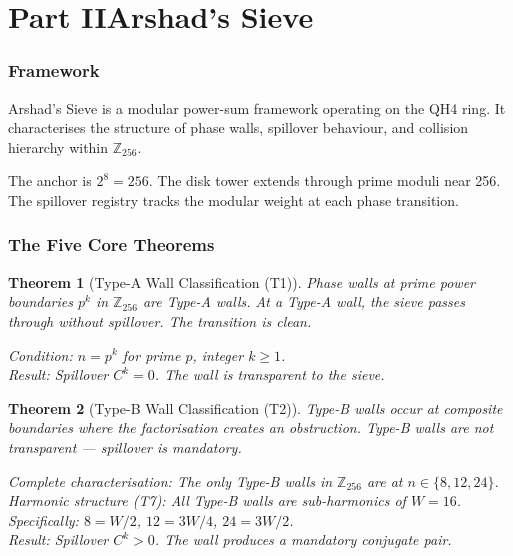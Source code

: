 \documentclass[12pt,a4paper]{article}
\newtheorem{theorem}{Theorem}[section]
\theoremstyle{definition}
\begin{document}
\part*{Part II\quad Arshad's Sieve}

\section{Framework}

Arshad's Sieve is a modular power-sum framework operating on the QH4 ring. It characterises the structure of phase walls, spillover behaviour, and collision hierarchy within $\mathbb{Z}_{256}$.

The anchor is $2^{8} = 256$. The disk tower extends through prime moduli near 256. The spillover registry tracks the modular weight at each phase transition.

\section{The Five Core Theorems}

\begin{theorem}[Type-A Wall Classification (T1)]
Phase walls at prime power boundaries $p^{k}$ in $\mathbb{Z}_{256}$ are \emph{Type-A walls}. At a Type-A wall, the sieve passes through without spillover. The transition is clean.

\textit{Condition:} $n = p^{k}$ for prime $p$, integer $k \geq 1$.\\
\textit{Result:} Spillover $C^{k} = 0$. The wall is transparent to the sieve.
\end{theorem}

\begin{theorem}[Type-B Wall Classification (T2)]
Type-B walls occur at composite boundaries where the factorisation creates an obstruction. Type-B walls are not transparent --- spillover is mandatory.

\textit{Complete characterisation:} The only Type-B walls in $\mathbb{Z}_{256}$ are at $n \in \{8, 12, 24\}$.\\
\textit{Harmonic structure (T7):} All Type-B walls are sub-harmonics of $W = 16$. Specifically: $8 = W/2$, $12 = 3W/4$, $24 = 3W/2$.\\
\textit{Result:} Spillover $C^{k} > 0$. The wall produces a mandatory conjugate pair.
\end{theorem}
\end{document}
